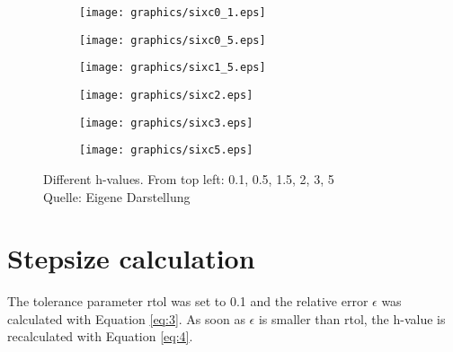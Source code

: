 			\begin{figure} [H]
				\begin{center}
					\begin{subfigure}{0.3\textwidth}
						\begin{center}
							\texttt{[image: graphics/sixc0\_1.eps]}
						\end{center}
					\end{subfigure}
					\begin{subfigure}{0.3\textwidth}
						\begin{center}
							\texttt{[image: graphics/sixc0\_5.eps]}
						\end{center}
					\end{subfigure}
					\begin{subfigure}{0.3\textwidth}
						\begin{center}
							\texttt{[image: graphics/sixc1\_5.eps]}
						\end{center}
					\end{subfigure}
					\begin{subfigure}{0.3\textwidth}
						\begin{center}
							\texttt{[image: graphics/sixc2.eps]}
						\end{center}
					\end{subfigure}
					\begin{subfigure}{0.3\textwidth}
						\begin{center}
							\texttt{[image: graphics/sixc3.eps]}
						\end{center}
					\end{subfigure}
					\begin{subfigure}{0.3\textwidth}
						\begin{center}
							\texttt{[image: graphics/sixc5.eps]}
						\end{center}
					\end{subfigure}
					\caption[Different h-values]{Different h-values. From top left: 0.1, 0.5, 1.5, 2, 3, 5\\
						Quelle: Eigene Darstellung}
					\label{fig:sixc}
				\end{center}
			\end{figure}
	
	
	\section{Stepsize calculation}
	The tolerance parameter rtol was set to 0.1 and the relative error $\epsilon$ was calculated with Equation \ref{eq:3}. As soon as $\epsilon$ is smaller than rtol, the h-value is recalculated with Equation \ref{eq:4}.
	
